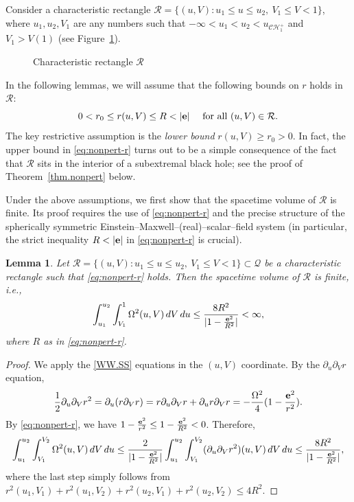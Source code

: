 \documentclass[10pt, reqno]{amsart}
\newtheorem{lemma}[theorem]{Lemma}
\theoremstyle{definition}
\theoremstyle{remark}
\numberwithin{equation}{section}
\newcommand{\abs}[1]{\vert#1\vert}
\newcommand{\set}[1]{\{#1\}}
\newcommand{\rd}{\partial}
\newcommand{\0}{\emptyset}
\newcommand{\Omg}{\Omega}
\newcommand{\bfe}{{\bf e}}
\newcommand{\calC}{\mathcal C}
\newcommand{\calH}{\mathcal H}
\newcommand{\calQ}{\mathcal Q}
\newcommand{\calR}{\mathcal R}
\newcommand{\f}{\frac}
\newcommand{\CH}{\calC \calH^{+}}		%
\begin{document}
Consider a characteristic rectangle $\calR = \set{(u, V) : u_{1} \leq u \leq u_{2}, \ V_{1} \leq V < 1}$, where $u_{1}, u_{2}, V_{1}$ are any numbers such that $-\infty < u_{1} < u_{2} < u_{\CH_{1}}$ and $V_{1} > V(1)$ (see Figure~\ref{fig:nonpert}).

\begin{figure}[h]
\begin{center}
\def\svgwidth{180px}
 
\caption{Characteristic rectangle $\calR$} \label{fig:nonpert}
\end{center}
\end{figure}

In the following lemmas, we will assume that the following bounds on $r$ holds in $\calR$:
\begin{equation} \label{eq:nonpert-r}
	0 < r_{0} \leq r(u, V) \leq R < \abs{\bfe} \quad \hbox{ for all } (u, V) \in \calR.
\end{equation}
The key restrictive assumption is the \emph{lower bound} $r(u, V) \geq r_{0} > 0$. In fact, the upper bound in \eqref{eq:nonpert-r} turns out to be a simple consequence of the fact that $\calR$ sits in the interior of a subextremal black hole; see the proof of Theorem~\ref{thm.nonpert} below. 

Under the above assumptions, we first show that the spacetime volume of $\calR$ is finite. Its proof requires the use of \eqref{eq:nonpert-r} and the precise structure of the spherically symmetric Einstein--Maxwell--(real)--scalar--field system (in particular, the strict inequality $R < \abs{\bfe}$ in \eqref{eq:nonpert-r} is crucial).

\begin{lemma} \label{lem.nonpert-vol}
Let $\calR = \set{(u, V) : u_{1} \leq u \leq u_{2}, \ V_{1} \leq V < 1} \subset \calQ$ be a characteristic rectangle such that \eqref{eq:nonpert-r} holds. Then the spacetime volume of $\calR$ is finite, i.e.,
\begin{equation}\label{finite.volume}
\int_{u_1}^{u_2}\int_{V_1}^{1} \Omg^2(u,V)\, d V\, du\leq \f {8 R^2}{|1-\f{{\bf e}^2}{R^2}|}<\infty,
\end{equation}
where $R$ as in \eqref{eq:nonpert-r}.
\end{lemma}
\begin{proof}
We apply the \eqref{WW.SS} equations in the $(u, V)$ coordinate. By the $\rd_u\rd_{V} r$ equation, 
\begin{equation}\label{r2.uv}
\f 1{2}\rd_u\rd_{V} r^2=\rd_u(r\rd_{V} r) =r\rd_u\rd_{V} r+\rd_u r\rd_{V} r=-\f {\Omg^2}{4 }(1-\f{{\bf e}^2}{r^2}).
\end{equation}
By \eqref{eq:nonpert-r}, we have $1-\f{{\bf e}^2}{r^2}\leq 1-\f{{\bf e}^2}{R^2}<0$. Therefore, 
$$\int_{u_1}^{u_2}\int_{V_1}^{V_2} \Omg^2(u,V)\, d V\, du\leq \f 2{|1-\f{{\bf e}^2}{R^2}|} \int_{u_1}^{u_2}\int_{V_1}^{V_2} (\rd_u\rd_{V}r^2)(u,V)\, dV\, du\leq \f {8 R^2}{|1-\f{{\bf e}^2}{R^2}|},$$
where the last step simply follows from $r^2(u_1, V_1)+r^2(u_1, V_2)+r^2(u_2, V_1)+r^2(u_2, V_2)\leq 4R^2$.
\end{proof}
\end{document}

